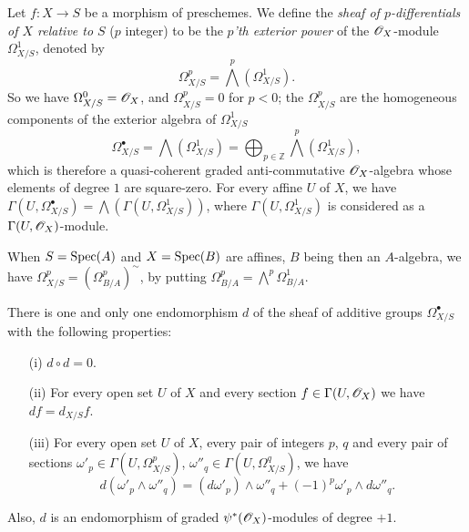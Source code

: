 \begin{env}[16.6.1]
\label{IV.16.6.1}
Let $f:X \to S$ be a morphism of preschemes.
We define the \emph{sheaf of $p$-differentials of $X$ relative to $S$} ($p$ integer) to be the \emph{$p$'th exterior power}  of the $\mathscr{O}_X$-module $\Omega_{X/S}^1$, denoted by
\[
  \label{IV.16.6.1.1}
  \Omega_{X/S}^p = \bigwedge^p(\Omega_{X/S}^1).
  \tag{16.6.1.1}
\] 
So we have $\Omega_{X/S}^0 = \mathscr{O}_X$, and $\Omega_{X/S}^p = 0$ for $p < 0$;
the $\Omega_{X/S}^p$ are the homogeneous components of the exterior algebra of $\Omega_{X/S}^1$
\[  
  \label{IV.16.6.1.2}
  \Omega_{X/S}^\bullet = \bigwedge(\Omega_{X/S}^1) = \bigoplus_{p \in \mathbb{Z}}\bigwedge^p(\Omega_{X/S}^1),  
  \tag{16.6.1.2}
\] 
which is therefore a quasi-coherent graded anti-commutative $\mathscr{O}_X$-algebra whose elements of degree $1$ are square-zero.
For every affine $U$ of $X$, we have $\Gamma(U, \Omega_{X/S}^\bullet) = \bigwedge (\Gamma(U, \Omega_{X/S}^1))$, where $\Gamma(U, \Omega_{X/S}^1)$ is considered as a $\Gamma(U, \mathscr{O}_X)$-module.

When $S = \operatorname{Spec}(A)$ and $X = \operatorname{Spec}(B)$ are affines, $B$ being then an $A$-algebra, we have  $\Omega_{X/S}^p = (\Omega_{B/A}^p)^\sim$, by putting $\Omega_{B/A}^p = \bigwedge^p\Omega^1_{B/A}$. 
\end{env}

\begin{theorem}[16.6.2]
\label{IV.16.6.2}
There is one and only one endomorphism $d$ of the sheaf of additive groups $\Omega_{X/S}^\bullet$ with the following properties:
\begin{enumerate}
  \item[\rm{(i)}] $d \circ d = 0$.
  \item[\rm{(ii)}] For every open set $U$ of $X$ and every section $f \in \Gamma(U, \mathscr{O}_X)$ we have $df = d_{X/S}f$. 
  \item[\rm{(iii)}] For every open set $U$ of $X$, every pair of integers $p$, $q$ and every pair of sections $\omega'_p \in \Gamma(U, \Omega_{X/S}^p)$, $\omega''_q \in \Gamma(U, \Omega_{X/S}^q)$, we have
  \[
    \label{IV.16.6.2.1}
    d(\omega'_p \wedge \omega''_q) = (d\omega'_p) \wedge \omega''_q + (-1)^p \omega'_p \wedge d\omega''_q.
    \tag{16.6.2.1}
  \]
\end{enumerate}
Also, $d$ is an endomorphism of graded $\psi^*(\mathscr{O}_X)$-modules of degree $+1$.
\end{theorem}

